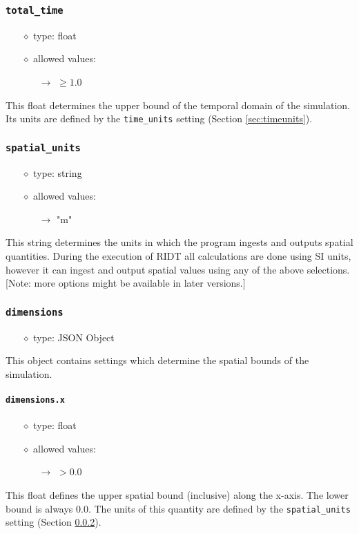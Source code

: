 \documentclass[]{article}
\def\code#1{\texttt{#1}}
\begin{document}
\subsubsection{\code{total\_time}}\label{sec:totaltime}
\begin{itemize}
    \item[$\diamond$] type: float 
    \item[$\diamond$] allowed values:
    \begin{itemize}
        \item[$\rightarrow$] $\geq1.0$
    \end{itemize}
\end{itemize}
This float determines the upper bound of the temporal domain of the simulation.
Its units are defined by the \code{time\_units} setting (Section
\ref{sec:timeunits}).

\subsubsection{\code{spatial\_units}}\label{sec:spatialunits}
\begin{itemize}
    \item[$\diamond$] type: string 
    \item[$\diamond$] allowed values:
    \begin{itemize}
        \item[$\rightarrow$] "m"
    \end{itemize}
\end{itemize}
This string determines the units in which the program ingests and outputs spatial
quantities. During the execution of RIDT all calculations are done using SI
units, however it can ingest and output spatial values using any of the above
selections. [Note: more options might be available in later versions.]

\subsubsection{\code{dimensions}}
\begin{itemize}
    \item[$\diamond$] type: JSON Object 
\end{itemize}
This object contains settings which determine the spatial bounds of the
simulation.

\paragraph{\code{dimensions.x}}\label{sec:dimx}
\begin{itemize}
    \item[$\diamond$] type: float 
    \item[$\diamond$] allowed values:
    \begin{itemize}
        \item[$\rightarrow$] $>0.0$
    \end{itemize}
\end{itemize}
This float defines the upper spatial bound (inclusive) along the x-axis. The
lower bound is always 0.0. The units of this quantity are defined by the
\code{spatial\_units} setting (Section \ref{sec:spatialunits}).
\end{document}
